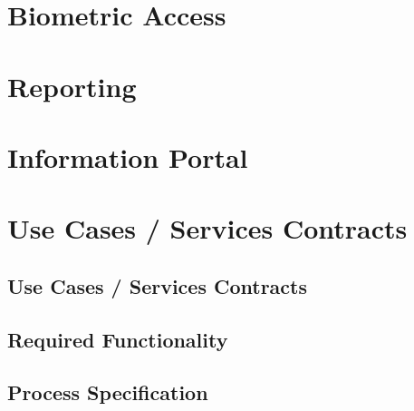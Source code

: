 \documentclass[11pt,a4paper,titlepage]{article}
\begin{document}
	\section{Biometric Access}
	
	
	\section{Reporting}
	
	
	\section{Information Portal}
	
		
		
	
	\section{Use Cases / Services Contracts}

	\subsection{Use Cases / Services Contracts}

		
	
	\subsection{Required Functionality}
		
	
	\subsection{Process Specification}
		
	

	
\end{document}
